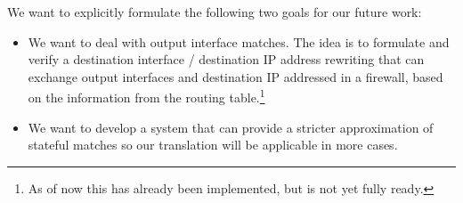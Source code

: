 We want to explicitly formulate the following two goals for our future work:
\begin{itemize}
	\item We want to deal with output interface matches.
		The idea is to formulate and verify a destination interface / destination IP address rewriting that can exchange output interfaces and destination IP addressed in a firewall, based on the information from the routing table.\footnote{As of now this has already been implemented, but is not yet fully ready.}
	\item We want to develop a system that can provide a stricter approximation of stateful matches so our translation will be applicable in more cases.
\end{itemize}
